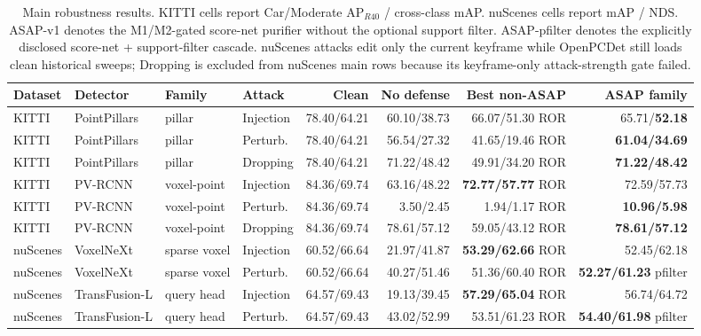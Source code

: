 \begin{table}[t]
\centering
\scriptsize
\setlength{\tabcolsep}{3.2pt}
\caption{Main robustness results. KITTI cells report Car/Moderate AP$_{R40}$ / cross-class mAP. nuScenes cells report mAP / NDS. ASAP-v1 denotes the M1/M2-gated score-net purifier without the optional support filter. ASAP-pfilter denotes the explicitly disclosed score-net + support-filter cascade. nuScenes attacks edit only the current keyframe while OpenPCDet still loads clean historical sweeps; Dropping is excluded from nuScenes main rows because its keyframe-only attack-strength gate failed.}
\label{tab:main_results}
\begin{tabular}{llllrrrr}
\toprule
Dataset & Detector & Family & Attack & Clean & No defense & Best non-ASAP & ASAP family \\
\midrule
KITTI & PointPillars & pillar & Injection & 78.40/64.21 & 60.10/38.73 & 66.07/51.30 ROR & 65.71/\textbf{52.18} \\
KITTI & PointPillars & pillar & Perturb. & 78.40/64.21 & 56.54/27.32 & 41.65/19.46 ROR & \textbf{61.04/34.69} \\
KITTI & PointPillars & pillar & Dropping & 78.40/64.21 & 71.22/48.42 & 49.91/34.20 ROR & \textbf{71.22/48.42} \\
KITTI & PV-RCNN & voxel-point & Injection & 84.36/69.74 & 63.16/48.22 & \textbf{72.77/57.77} ROR & 72.59/57.73 \\
KITTI & PV-RCNN & voxel-point & Perturb. & 84.36/69.74 & 3.50/2.45 & 1.94/1.17 ROR & \textbf{10.96/5.98} \\
KITTI & PV-RCNN & voxel-point & Dropping & 84.36/69.74 & 78.61/57.12 & 59.05/43.12 ROR & \textbf{78.61/57.12} \\
nuScenes & VoxelNeXt & sparse voxel & Injection & 60.52/66.64 & 21.97/41.87 & \textbf{53.29/62.66} ROR & 52.45/62.18 \\
nuScenes & VoxelNeXt & sparse voxel & Perturb. & 60.52/66.64 & 40.27/51.46 & 51.36/60.40 ROR & \textbf{52.27/61.23} pfilter \\
nuScenes & TransFusion-L & query head & Injection & 64.57/69.43 & 19.13/39.45 & \textbf{57.29/65.04} ROR & 56.74/64.72 \\
nuScenes & TransFusion-L & query head & Perturb. & 64.57/69.43 & 43.02/52.99 & 53.51/61.23 ROR & \textbf{54.40/61.98} pfilter \\
\bottomrule
\end{tabular}
\end{table}

